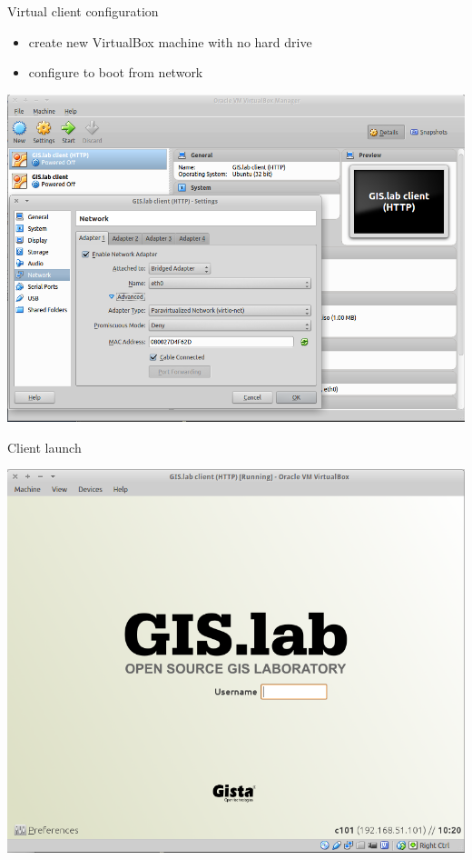 \documentclass[12pt]{beamer}
\begin{document}
\begin{frame}{Virtual client configuration}
	\begin{itemize}
		\item create new VirtualBox machine with no hard drive
		\item configure to boot from network
	\end{itemize}
	\begin{center}
		\includegraphics[keepaspectratio=true,height=0.6\textheight]{images/real-world-example/client-virtualbox-configuration.png}
	\end{center}
\end{frame}


\begin{frame}{Client launch}
	\begin{center}
		\includegraphics[keepaspectratio=true,height=0.7\textheight]{images/real-world-example/client-login.png}
	\end{center}
\end{frame}
\end{document}

